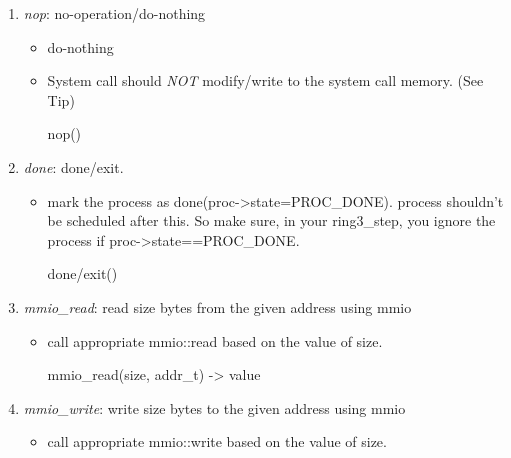 \documentclass[]{book}
\newenvironment{Shaded}{}{}
\newcommand{\NormalTok}[1]{{#1}}
\begin{document}
\begin{enumerate}
\def\labelenumi{\arabic{enumi}.}
\setcounter{enumi}{-1}
\itemsep1pt\parskip0pt
\item
  \emph{nop}: no-operation/do-nothing

  \begin{itemize}
  \item
    do-nothing
  \item
    System call should \emph{NOT} modify/write to the system call
    memory. (See Tip)

\begin{Shaded}
\begin{Highlighting}[]
\NormalTok{nop()}
\end{Highlighting}
\end{Shaded}
  \end{itemize}
\item
  \emph{done}: done/exit.

  \begin{itemize}
  \item
    mark the process as done(proc-\textgreater{}state=PROC\_DONE).
    process shouldn't be scheduled after this. So make sure, in your
    ring3\_step, you ignore the process if
    proc-\textgreater{}state==PROC\_DONE.

\begin{Shaded}
\begin{Highlighting}[]
\NormalTok{done/exit()}
\end{Highlighting}
\end{Shaded}
  \end{itemize}
\item
  \emph{mmio\_read}: read size bytes from the given address using mmio

  \begin{itemize}
  \item
    call appropriate mmio::read based on the value of size.

\begin{Shaded}
\begin{Highlighting}[]
\NormalTok{mmio_read(size, addr_t) -> value}
\end{Highlighting}
\end{Shaded}
  \end{itemize}
\item
  \emph{mmio\_write}: write size bytes to the given address using mmio

  \begin{itemize}
  \item
    call appropriate mmio::write based on the value of size.


\end{itemize}
\end{enumerate}
\end{document}
